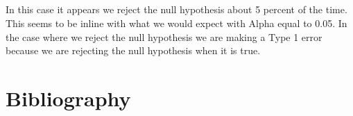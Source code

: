 \documentclass[letterpaper, onecolumn,10pt]{IEEEtran}
\begin{document}
            \subsection{}
                In this case it appears we reject the null hypothesis about 5 percent of the time. This seems to be inline with what we would expect with Alpha equal to 0.05. In the case where we reject the null hypothesis we are making a Type 1 error because we are rejecting the null hypothesis when it is true.\\
            
        
		
		
		\section{Bibliography}
		
		
\end{document}
